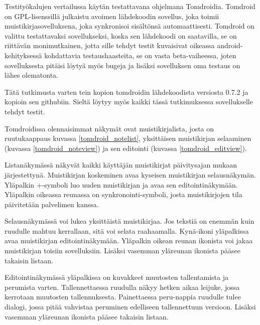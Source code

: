 Testityökalujen vertailussa käytän testattavana ohjelmana Tomdroidia. Tomdroid on GPL-lisenssillä julkaistu avoimen lähdekoodin sovellus, joka toimii muistikirjasovelluksena, joka synkronisoi sisältönsä automaattisesti. \cite{tomdroid} Tomdroid on valittu testattavaksi sovellukseksi, koska sen lähdekoodi on saatavilla, se on riittävän monimutkainen, jotta sille tehdyt testit kuvaisivat oikeassa android-kehityksessä kohdattavia testaushaasteita, se on vasta beta-vaiheessa, joten sovelluksesta pitäisi löytyä myös bugeja ja lisäksi sovelluksen oma testaus on lähes olematonta.

Tätä tutkimusta varten tein kopion tomdroidin lähdekoodista versiosta 0.7.2 ja kopioin sen githubiin. Sieltä löytyy myös kaikki tässä tutkimuksessa sovellukselle tehdyt testit. \cite{tomdroid_github}

Tomdroidissa olennaisimmat näkymät ovat muistikirjalista, josta on ruutukaappaus kuvassa \ref{tomdroid_notelist}, yksittäisen muistikirjan selaaminen (kuvassa \ref{tomdroid_noteview}) ja sen editointi (kuvassa \ref{tomdroid_editview}). 

Listanäkymässä näkyvät kaikki käyttäjän muistikirjat päivitysajan mukaan järjestettynä. Muistikirjan koskeminen avaa kyseisen muistikirjan selausnäkymän. Yläpalkin +-symboli luo uuden muistikirjan ja avaa sen editointinäkymään. Yläpalkin oikeassa reunassa on synkronointi-symboli, josta muistikirjojen tila päivitetään palvelimen kanssa.

Selausnäkymässä voi lukea yksittäistä muistikirjaa. Jos tekstiä on enemmän kuin ruudulle mahtuu kerrallaan, sitä voi selata raahaamalla. Kynä-ikoni yläpalkissa avaa muistikirjan editointinäkymään. Yläpalkin oikean reunan ikonista voi jakaa muistikirjan toisiin sovelluksiin. Lisäksi vasemman yläreunan ikonista pääsee takaisin listaan.

Editointinäkymässä yläpalkissa on kuvakkeet muutosten tallentamista ja perumista varten. Tallennettaessa ruudulla näkyy hetken aikaa leijuke, jossa kerrotaan muutosten tallennuksesta. Painettaessa peru-nappia ruudulle tulee dialogi, jossa pitää vahvistaa peruminen edelliseen tallennettuun versioon. Lisäksi vasemman yläreunan ikonista pääsee takaisin listaan.

